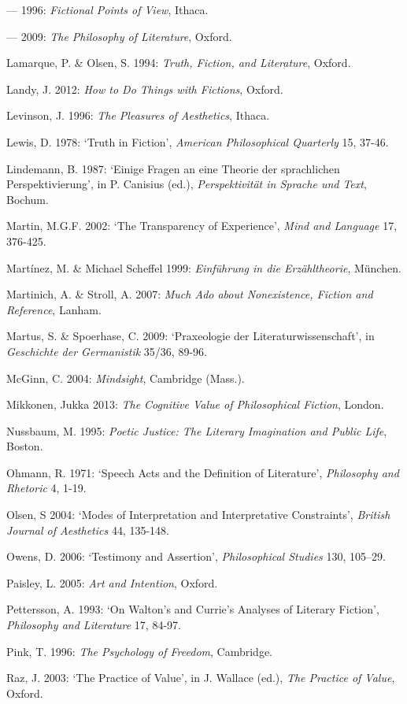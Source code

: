 \begin{hangparas}{.5cm}{1}
--- 1996: \emph{Fictional Points of View}, Ithaca. 

--- 2009: \emph{The Philosophy of Literature}, Oxford. 

Lamarque, P. \& Olsen, S. 1994: \emph{Truth, Fiction, and Literature}, Oxford.

Landy, J. 2012: \emph{How to Do Things with Fictions}, Oxford.

Levinson, J. 1996: \emph{The Pleasures of Aesthetics}, Ithaca.

Lewis, D. 1978: `Truth in Fiction', \emph{American Philosophical Quarterly} 15, 37-46.

Lindemann, B. 1987: `Einige Fragen an eine Theorie der sprachlichen Perspektivierung', in P. Canisius (ed.), \emph{Perspektivit\"at in Sprache und Text}, Bochum.

Martin, M.G.F. 2002: `The Transparency of Experience', \emph{Mind and Language} 17, 376-425.

Mart\'inez, M. \& Michael Scheffel 1999: \emph{Einf\"uhrung in die Erz\"ahltheorie}, M\"unchen.

Martinich, A. \& Stroll, A. 2007: \emph{Much Ado about Nonexistence, Fiction and Reference}, Lanham.

Martus, S. \& Spoerhase, C. 2009: `Praxeologie der Literaturwissenschaft', in \emph{Geschichte der Germanistik} 35/36, 89-96.

McGinn, C. 2004: \emph{Mindsight}, Cambridge (Mass.).

Mikkonen, Jukka 2013: \emph{The Cognitive Value of Philosophical Fiction}, London.

Nussbaum, M. 1995: \emph{Poetic Justice: The Literary Imagination and Public Life}, Boston.

Ohmann, R. 1971: `Speech Acts and the Definition of Literature', \emph{Philosophy and Rhetoric} 4, 1-19.

Olsen, S 2004: `Modes of Interpretation and Interpretative Constraints', \emph{British Journal of Aesthetics} 44, 135-148.

Owens, D. 2006: `Testimony and Assertion', \emph{Philosophical Studies} 130, 105--29.

Paisley, L. 2005: \emph{Art and Intention}, Oxford.

Pettersson, A. 1993: `On Walton's and Currie's Analyses of Literary Fiction', \emph{Philosophy and Literature} 17, 84-97.

Pink, T. 1996: \emph{The Psychology of Freedom}, Cambridge.

Raz, J. 2003: `The Practice of Value', in J. Wallace (ed.), \emph{The Practice of Value}, Oxford.


\end{hangparas}
